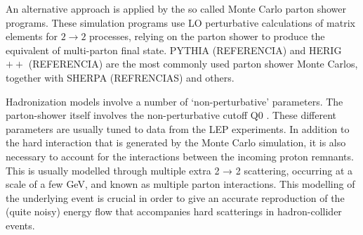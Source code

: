 An alternative approach is applied by the so called Monte Carlo parton shower programs. These simulation programs use LO perturbative calculations of matrix elements for $2 \rightarrow 2$ processes, relying on the parton shower to produce the equivalent of multi-parton final state.  PYTHIA (REFERENCIA) and HERIG$++$ (REFERENCIA) are the most commonly used parton shower Monte Carlos, together with SHERPA (REFRENCIAS) and others.  







Hadronization models involve a number of ‘non-perturbative’ parameters. The parton-shower
itself involves the non-perturbative cutoff Q0 . These different parameters are usually tuned to data from
the LEP experiments.
In addition to the hard interaction that is generated by the Monte Carlo
simulation, it is also necessary to account for the interactions between the incoming proton 
remnants. This is usually modelled through multiple extra 2 → 2 scattering, occurring at a scale of a
few GeV, and known as multiple parton interactions. This modelling of the underlying event is crucial in
order to give an accurate reproduction of the (quite noisy) energy flow that accompanies hard scatterings
in hadron-collider events.




